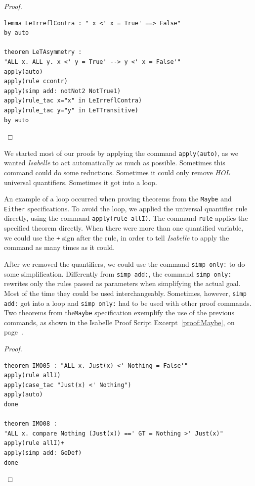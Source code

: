 \documentclass[12pt,twoside]{article}
\numberwithin{spec}{subsection}
\numberwithin{proof}{subsection}
\numberwithin{figure}{subsection}
\numberwithin{code}{subsection}
\newcommand{\citeProof}[1]{Isabelle Proof Script Excerpt~\ref{#1}, on page~\pageref{#1}}
\begin{document}
\begin{proof}
\begin{verbatim}
lemma LeIrreflContra : " x <' x = True' ==> False"
by auto

theorem LeTAsymmetry :
"ALL x. ALL y. x <' y = True' --> y <' x = False'"
apply(auto)
apply(rule ccontr)
apply(simp add: notNot2 NotTrue1)
apply(rule_tac x="x" in LeIrreflContra)
apply(rule_tac y="y" in LeTTransitive)
by auto
\end{verbatim}
\caption{Proof for the axiom LeTAsymmetry from specification Ord.}
\label{proof:Ord}
\end{proof}

We started most of our proofs by applying the command \verb.apply(auto)., as we wanted \textit{Isabelle} to act automatically as much as possible. Sometimes this command could do some reductions. Sometimes it could only remove \textit{HOL} universal quantifiers. Sometimes it got into a loop.

An example of a loop occurred when proving theorems from the \verb.Maybe. and \verb.Either. specifications. To avoid the loop, we applied the universal quantifier rule directly, using the command \verb.apply(rule allI).. The command \verb.rule. applies the specified theorem directly. When there were more than one quantified variable, we could use the \verb.+. sign after the rule, in order  to tell \textit{Isabelle} to apply the command as many times as it could.

After we removed the quantifiers, we could use the command \verb.simp only:. to do some simplification. Differently from \verb.simp add:., the command \verb.simp only:. rewrites only the rules passed as parameters when simplifying the actual goal. Most of the time they could be used interchangeably. Sometimes, however, \verb.simp add:. got into a loop and \verb.simp only:. had to be used with other proof commands. Two theorems from the\verb.Maybe. specification exemplify the use of the previous commands, as shown in the \citeProof{proof:Maybe}.

\begin{proof}\capstart
\begin{verbatim}
theorem IMO05 : "ALL x. Just(x) <' Nothing = False'"
apply(rule allI)
apply(case_tac "Just(x) <' Nothing")
apply(auto)
done

theorem IMO08 :
"ALL x. compare Nothing (Just(x)) ==' GT = Nothing >' Just(x)"
apply(rule allI)+
apply(simp add: GeDef)
done
\end{verbatim}
\caption{Proof for theorems IMO05 and IMO08 from specification Maybe.}
\label{proof:Maybe}
\end{proof}
\end{document}
